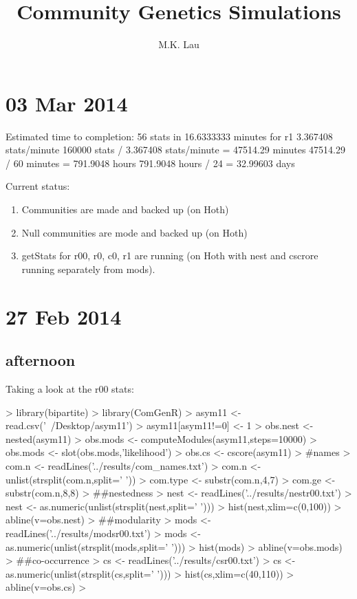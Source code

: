 \documentclass[12pt]{article}
\title{Community Genetics Simulations}
\author{M.K. Lau}
\begin{document}
\maketitle
\linenumbers %

\setcounter{tocdepth}{3}  %
\tableofcontents


\section{03 Mar 2014}

Estimated time to completion:
56 stats in 16.6333333 minutes for r1
3.367408 stats/minute
160000 stats / 3.367408 stats/minute = 47514.29 minutes
47514.29 / 60 minutes = 791.9048 hours
791.9048 hours / 24 = 32.99603 days

Current status:

\begin{enumerate}
\item Communities are made and backed up (on Hoth)
\item Null communities are mode and backed up (on Hoth)
\item getStats for r00, r0, c0, r1 are running (on Hoth with nest and
  cscrore running separately from mods).
\end{enumerate}

\section{27 Feb 2014}

\subsection*{afternoon}
Taking a look at the r00 stats:

\begin{Schunk}
\begin{Sinput}
> library(bipartite)
> library(ComGenR)
> asym11 <- read.csv('~/Desktop/asym11')
> asym11[asym11!=0] <- 1
> obs.nest <- nested(asym11)
> obs.mods <- computeModules(asym11,steps=10000)
> obs.mods <- slot(obs.mods,'likelihood')
> obs.cs <- cscore(asym11)
> #names
> com.n <- readLines('../results/com_names.txt')
> com.n <- unlist(strsplit(com.n,split=' '))
> com.type <- substr(com.n,4,7)
> com.ge <- substr(com.n,8,8)
> ##nestedness
> nest <- readLines('../results/nestr00.txt')
> nest <- as.numeric(unlist(strsplit(nest,split=' ')))
> hist(nest,xlim=c(0,100))
> abline(v=obs.nest)
> ##modularity
> mods <- readLines('../results/modsr00.txt')
> mods <- as.numeric(unlist(strsplit(mods,split=' ')))
> hist(mods)
> abline(v=obs.mods)
> ##co-occurrence
> cs <- readLines('../results/csr00.txt')
> cs <- as.numeric(unlist(strsplit(cs,split=' ')))
> hist(cs,xlim=c(40,110))
> abline(v=obs.cs)
> 
\end{Sinput}
\end{Schunk}
\end{document}
